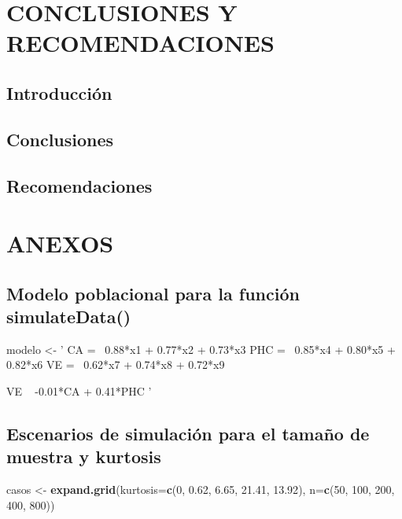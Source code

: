 \documentclass[
]{article}
\newenvironment{Shaded}{\begin{snugshade}}{\end{snugshade}}
\newcommand{\DataTypeTok}[1]{\textcolor[rgb]{0.13,0.29,0.53}{#1}}
\newcommand{\DecValTok}[1]{\textcolor[rgb]{0.00,0.00,0.81}{#1}}
\newcommand{\FloatTok}[1]{\textcolor[rgb]{0.00,0.00,0.81}{#1}}
\newcommand{\KeywordTok}[1]{\textcolor[rgb]{0.13,0.29,0.53}{\textbf{#1}}}
\newcommand{\NormalTok}[1]{#1}
\newcommand{\StringTok}[1]{\textcolor[rgb]{0.31,0.60,0.02}{#1}}
\begin{document}
\newpage

\section{CONCLUSIONES Y RECOMENDACIONES}

\subsection{Introducción}

\subsection{Conclusiones}

\subsection{Recomendaciones}

\newpage

\section{ANEXOS}

\subsection{Modelo poblacional para la función simulateData()}

\label{modelo}

\begin{Shaded}
\begin{Highlighting}[]
\NormalTok{modelo <-}\StringTok{ ' CA =~ 0.88*x1 + 0.77*x2 + 0.73*x3}
\StringTok{            PHC =~ 0.85*x4 + 0.80*x5 + 0.82*x6}
\StringTok{            VE =~ 0.62*x7 + 0.74*x8 + 0.72*x9}

\StringTok{            VE ~ -0.01*CA + 0.41*PHC}
\StringTok{          '}
\end{Highlighting}
\end{Shaded}

\subsection{Escenarios de simulación para el tamaño de muestra y kurtosis}

\label{escenarios}

\begin{Shaded}
\begin{Highlighting}[]
\NormalTok{casos <-}\StringTok{ }\KeywordTok{expand.grid}\NormalTok{(}\DataTypeTok{kurtosis=}\KeywordTok{c}\NormalTok{(}\DecValTok{0}\NormalTok{, }\FloatTok{0.62}\NormalTok{, }\FloatTok{6.65}\NormalTok{, }\FloatTok{21.41}\NormalTok{, }\FloatTok{13.92}\NormalTok{), }\DataTypeTok{n=}\KeywordTok{c}\NormalTok{(}\DecValTok{50}\NormalTok{, }\DecValTok{100}\NormalTok{, }\DecValTok{200}\NormalTok{, }\DecValTok{400}\NormalTok{, }\DecValTok{800}\NormalTok{))}
\end{Highlighting}
\end{Shaded}
\end{document}
